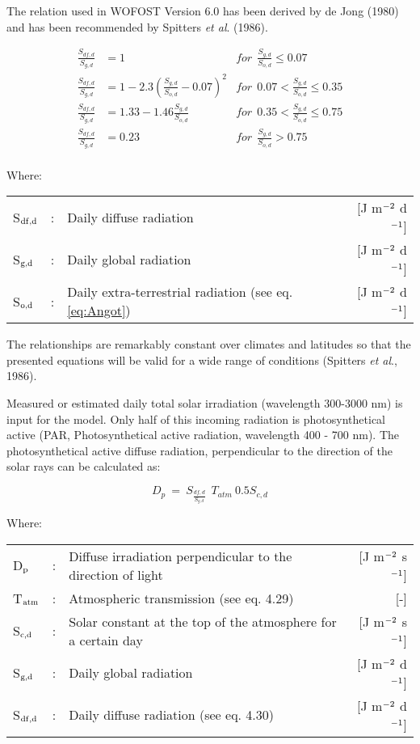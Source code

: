 The relation used in WOFOST Version 6.0 has been derived by de Jong (1980) and has
been recommended by Spitters {\it et al}. (1986).

\begin{align}
{\frac{S _{df,d} }{S _{g, d} }} &= 1 & 
      for ~~ {\frac{S _{g,d} }{S _{o,d} }} \le 0.07 \nonumber \\
{\frac{S _{df,d} }{S _{g,d} }} &= 1-2.3({\frac{S _{g,d} }{S _{o,d} }} -0.07) ^{2} & 
      for ~~ 0.07 < {\frac{S _{g,d} }{S _{o,d} }} \le 0.35  \nonumber \\
{\frac{S _{df,d} }{S _{g,d} }} &= 1.33-1.46{\frac{S _{g,d} }{S _{o,d} }} &
      for ~~ 0.35 < {\frac{S _{g,d} }{S _{o,d} }} \le 0.75 \nonumber \\
{\frac{S _{df,d} }{S _{g,d} }} &= 0.23 &
      for ~~ {\frac{S _{g,d} }{S _{o,d} }} > 0.75 \nonumber \\
\end{align}

Where:\\[5pt]
\begin{tabularx}{\textwidth}{llXr}
S$_{{\rm df,d}}$ &:& Daily diffuse radiation  & [J m$^{{\rm -2}}$ d$^{{\rm -1}}$]\\
S$_{{\rm g,d}}$ &:& Daily global radiation  & [J m$^{{\rm -2}}$ d$^{{\rm -1}}$]\\
S$_{{\rm o,d}}$ &:& Daily extra-terrestrial radiation (see eq. \ref{eq:Angot})  & [J m$^{{\rm -2}}$ d$^{{\rm -1}}$]\\
\end{tabularx}

The relationships are remarkably constant over climates and latitudes so that the presented
equations will be valid for a wide range of conditions (Spitters {\it et al}., 1986).

Measured or estimated daily total solar irradiation (wavelength 300-3000 nm) is input for
the model. Only half of this incoming radiation is photosynthetical active (PAR,
Photosynthetical active radiation, wavelength 400 - 700 nm). The photosynthetical active
diffuse radiation, perpendicular to the direction of the solar rays can be calculated as:

\begin{equation}
D _{p} ~=~ S _{\frac{df,d}{S _{g,d} }} ~~ T _{atm} ~0.5S _{c,d} 
\end{equation}

 
Where:\\[5pt]
\begin{tabularx}{\textwidth}{llXr}
D$_{{\rm p}}$ &:& Diffuse irradiation perpendicular to the direction of light  & [J m$^{{\rm -2}}$ s$^{{\rm -1}}$]\\
T$_{{\rm atm}}$ &:& Atmospheric transmission (see eq. 4.29)  & [-]\\
S$_{{\rm c,d}}$ &:& Solar constant at the top of the atmosphere for a certain day  & [J m$^{{\rm -2}}$ s$^{{\rm -1}}$]\\
S$_{{\rm g,d}}$ &:& Daily global radiation  & [J m$^{{\rm -2}}$ d$^{{\rm -1}}$]\\
S$_{{\rm df,d}}$ &:& Daily diffuse radiation (see eq. 4.30)  & [J m$^{{\rm -2}}$ d$^{{\rm -1}}$]\\
\end{tabularx}

